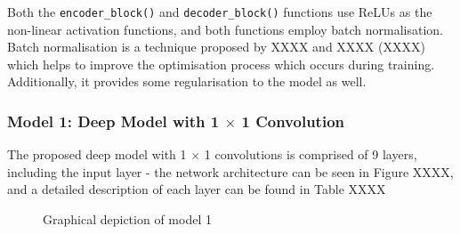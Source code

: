 \documentclass[a4paper]{article}
\begin{document}
Both the \verb|encoder_block()| and \verb|decoder_block()| functions use ReLUs as the non-linear activation functions, and both functions employ batch normalisation. Batch normalisation is a technique proposed by XXXX and XXXX (XXXX) which helps to improve the optimisation process which occurs during training. Additionally, it provides some regularisation to the model as well.

\clearpage

\subsubsection{Model 1: Deep Model with 1 $\times$ 1 Convolution}
The proposed deep model with 1 $\times$ 1 convolutions is comprised of 9 layers, including the input layer - the network architecture can be seen in Figure XXXX, and a detailed description of each layer can be found in Table XXXX
\begin{figure}[h]
\centering
{}
\caption{Graphical depiction of model 1}
\end{figure}
\end{document}
